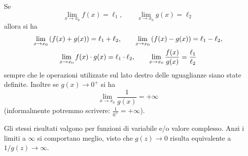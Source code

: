 \begin{theorem}
  \label{th:operazioni_limiti}%
\mymark{***}%
Se
\[
  \lim_{x\to x_0}f(x) = \ell_1,\qquad
  \lim_{x\to x_0}g(x) = \ell_2
\]
allora si ha
\begin{gather*}
  \lim_{x\to x_0} {\left( f(x) + g(x) \right)} = \ell_1 + \ell_2, \qquad
  \lim_{x\to x_0} {\left( f(x) - g(x) \right)} = \ell_1 - \ell_2, \\
  \lim_{x\to x_0} f(x)\cdot g(x) = \ell_1 \cdot \ell_2, \qquad
  \lim_{x\to x_0} \frac{f(x)}{g(x)} = \frac{\ell_1}{\ell_2}
\end{gather*}
sempre che le operazioni utilizzate sul lato destro delle uguaglianze
siano state definite.
Inoltre se $g(x)\to 0^+$ 
si ha
\[
    \lim_{x\to x_0} \frac{1}{g(x)} = +\infty
\]
(informalmente potremmo scrivere: $\frac{1}{0^+} = +\infty$).

Gli stessi risultati valgono per funzioni di variabile e/o valore complesso.
Anzi i limiti a $\infty$ si comportano meglio, visto che 
$g(z)\to 0$ risulta equivalente a $1/g(z)\to \infty$.

\end{theorem}
%

